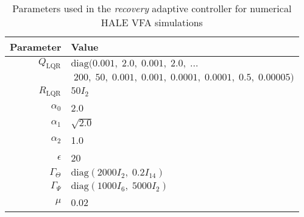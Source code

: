 
\begin{table}[htb]
 \renewcommand{\arraystretch}{1.6}
  \begin{tabular}{r|l}
    \textbf{Parameter} & \textbf{Value} \\
    \hline
	$Q_{\textrm{LQR}}$ & $\text{diag}(0.001, \; 2.0, \; 0.001, \; 2.0, \; \ldots $\\ & \qquad $\; 200, \; 50, \; 0.001, \; 0.001, \; 0.0001, \; 0.0001, \; 0.5, \; 0.00005)$ \\ 
	$R_{\textrm{LQR}}$ & $50 I_2$ \\
	$\alpha_0$ & 2.0 \\
	$\alpha_1$ & $\sqrt{2.0}$ \\
	$\alpha_2$ & 1.0 \\
	$\epsilon$ & 20 \\
	$\Gamma_\Theta$ & $\text{diag}(2000 I_2, \;0.2 I_{14})$ \\
	$\Gamma_\Psi$ & $\text{diag}(1000 I_6, \; 5000 I_2)$ \\
	$\mu$ & 0.02
  \end{tabular}
  \caption{Parameters used in the \textit{recovery} adaptive controller for numerical HALE VFA simulations}
\end{table}

\clearpage
\newpage
